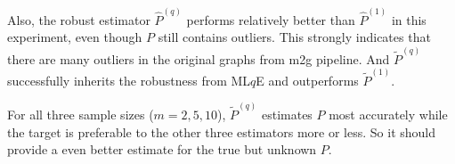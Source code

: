 \documentclass[a4paper]{article}
\renewcommand{\hat}{\widehat}
\begin{document}
Also, the robust estimator $\hat{P}^{(q)}$ performs relatively better than $\hat{P}^{(1)}$ in this experiment, even though $P$ still contains outliers. This strongly indicates that there are many outliers in the original graphs from m2g pipeline. And $\widetilde{P}^{(q)}$ successfully inherits the robustness from ML$q$E and outperforms $\widetilde{P}^{(1)}$.

For all three sample sizes ($m = 2, 5, 10$), $\widetilde{P}^{(q)}$ estimates $P$ most accurately while the target is preferable to the other three estimators more or less. So it should provide a even better estimate for the true but unknown $P$.



%
%
%
\end{document}
